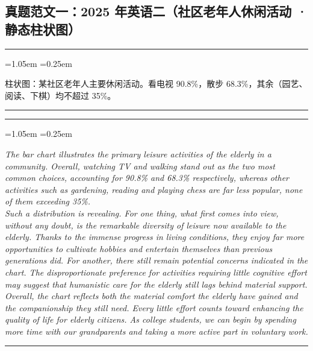 \documentclass[11pt,a4paper]{ctexart}
\newcommand{\en}[1]{\textit{#1}}
\newenvironment{tpl}[1]{%
  \par\addvspace{7pt}\needspace{4\baselineskip}%
  \noindent{\bfseries\color{accent}#1}\par\nopagebreak
  \vspace{2pt}\noindent\rule{\linewidth}{0.7pt}\par\nopagebreak\vspace{3pt}%
  \begin{list}{}{\leftmargin=1.05em \rightmargin=0.25em \listparindent=0pt
    \itemindent=0pt \topsep=0pt \parsep=2.5pt \itemsep=2.5pt \partopsep=0pt}%
  \item\relax
}{%
  \end{list}\vspace{1pt}\noindent\rule{\linewidth}{0.7pt}\par\addvspace{8pt}%
}
\begin{document}
\subsection{真题范文一：2025 年英语二（社区老年人休闲活动 · 静态柱状图）}

\begin{tpl}{题目要点}
柱状图：某社区老年人主要休闲活动。看电视 90.8\%，散步 68.3\%，其余（园艺、阅读、下棋）均不超过 35\%。
\end{tpl}

\begin{tpl}{批注版范文（157 词）}
\en{The bar chart illustrates the primary leisure activities of the elderly in a community. Overall, watching TV and walking stand out as the two most common choices, accounting for 90.8\% and 68.3\% respectively, whereas other activities such as gardening, reading and playing chess are far less popular, none of them exceeding 35\%.}\\[3pt]
\en{Such a distribution is revealing. For one thing, what first comes into view, without any doubt, is the remarkable diversity of leisure now available to the elderly. Thanks to the immense progress in living conditions, they enjoy far more opportunities to cultivate hobbies and entertain themselves than previous generations did. For another, there still remain potential concerns indicated in the chart. The disproportionate preference for activities requiring little cognitive effort may suggest that humanistic care for the elderly still lags behind material support.}\\[3pt]
\en{Overall, the chart reflects both the material comfort the elderly have gained and the companionship they still need. Every little effort counts toward enhancing the quality of life for elderly citizens. As college students, we can begin by spending more time with our grandparents and taking a more active part in voluntary work.}
\end{tpl}
\end{document}
